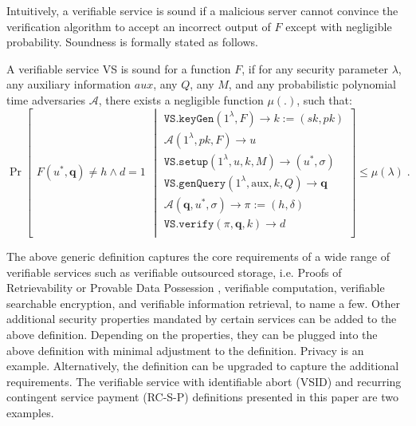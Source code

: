 Intuitively, a verifiable service is sound  if a malicious server cannot convince the verification algorithm to accept an incorrect output of $F$ except with negligible probability. %
Soundness is formally stated as follows.




\begin{definition}[VS Soundness] A verifiable service VS is sound  for a function $F$, if for  any security parameter $\lambda$, any auxiliary information $aux$, any  $Q$,  any $M$, and any probabilistic polynomial time adversaries $\mathcal{A}$, there exists a negligible function $\mu(.)$, such that: 
\small{
$$ \Pr\left[
  \begin{array}{l}
F(u^{\scriptscriptstyle *},\bm{q})\neq h \wedge d=1
\end{array} \middle | 
    \begin{array} {l}
 \mathtt{VS.keyGen}(1^{\lambda},F)\rightarrow k:=(sk,pk)\\
 \mathcal{A}(1^{\scriptscriptstyle\lambda},pk, F)\rightarrow u\\
\mathtt{VS.setup}(1^{\lambda}, u,k,M)\rightarrow (u^{\scriptscriptstyle *},\sigma)\\
 \mathtt{VS.genQuery}(1^{\lambda}, \text{aux},k,Q)\rightarrow \bm{q}\\
 \mathcal{A}(\bm{q},u^{\scriptscriptstyle *},\sigma)\rightarrow \pi:=(h,\delta)\\
 \mathtt{VS.verify}(\pi,\bm{q},k)\rightarrow d\\
\end{array}    \right]\leq \mu(\lambda)\;.$$
}
\end{definition}




The above generic definition captures the core requirements of a wide range of verifiable services such as verifiable outsourced storage, i.e. Proofs of Retrievability \cite{DBLP:journals/iacr/JuelsK07,DBLP:conf/asiacrypt/ShachamW08} or Provable Data Possession \cite{DBLP:conf/ccs/AtenieseBCHKPS07,ShenT11}, verifiable computation, verifiable searchable encryption, and verifiable information retrieval, to name a few. Other additional  security properties mandated by certain services can be added to the above definition. Depending on the properties,  they can be  plugged into  the above definition with minimal adjustment to the definition. Privacy is an example. Alternatively, the definition can be upgraded to capture the  additional requirements.  The verifiable service with identifiable abort (VSID) and recurring contingent service payment (RC-S-P) definitions presented in this paper are two examples. 








